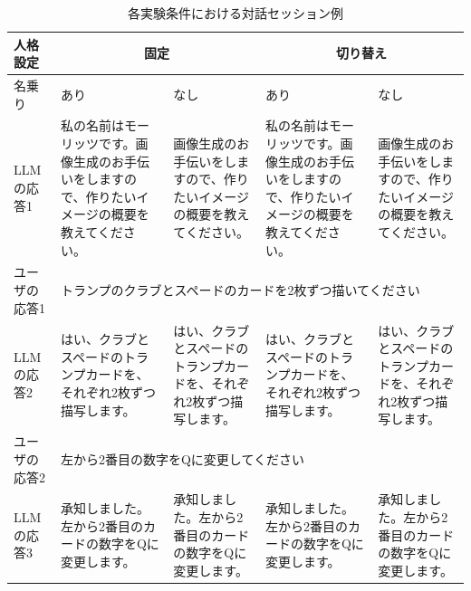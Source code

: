 \documentclass[10pt,twocolumn]{jsarticle}
\begin{document}
\begin{table}[htbp]
    \centering
    \caption{各実験条件における対話セッション例}
    \label{tab:dialogue_example_factors}
    \renewcommand{\arraystretch}{1.2}
    \scriptsize
    
    \begin{tabularx}{\textwidth}{lXXXX}
        \hline
        \multicolumn{1}{l}{人格設定} & \multicolumn{2}{c}{固定} & \multicolumn{2}{c}{切り替え} \\
        \hline
        \multicolumn{1}{l}{名乗り} & あり & なし & あり & なし \\
        \hline
        
        LLMの応答1 & 
        私の名前はモーリッツです。画像生成のお手伝いをしますので、作りたいイメージの概要を教えてください。
        & 画像生成のお手伝いをしますので、作りたいイメージの概要を教えてください。
        & 
        私の名前はモーリッツです。画像生成のお手伝いをしますので、作りたいイメージの概要を教えてください。
        & 
        画像生成のお手伝いをしますので、作りたいイメージの概要を教えてください。
         \\
        \hline
        
        ユーザの応答1 & \multicolumn{4}{l}{トランプのクラブとスペードのカードを2枚ずつ描いてください
        } \\
        \hline
        
        LLMの応答2 & 
        はい、クラブとスペードのトランプカードを、それぞれ2枚ずつ描写します。
        & 
        はい、クラブとスペードのトランプカードを、それぞれ2枚ずつ描写します。
        & 
        はい、クラブとスペードのトランプカードを、それぞれ2枚ずつ描写します。
        & 
        はい、クラブとスペードのトランプカードを、それぞれ2枚ずつ描写します。
         \\
        \hline
        
        ユーザの応答2 & \multicolumn{4}{l}{左から2番目の数字をQに変更してください
        } \\
        \hline
        
        LLMの応答3 & 
        承知しました。左から2番目のカードの数字をQに変更します。
        & 
        承知しました。左から2番目のカードの数字をQに変更します。
        & 
        承知しました。左から2番目のカードの数字をQに変更します。
        & 
        承知しました。左から2番目のカードの数字をQに変更します。
         \\
        \hline
        

\end{tabularx}
\end{table}
\end{document}
